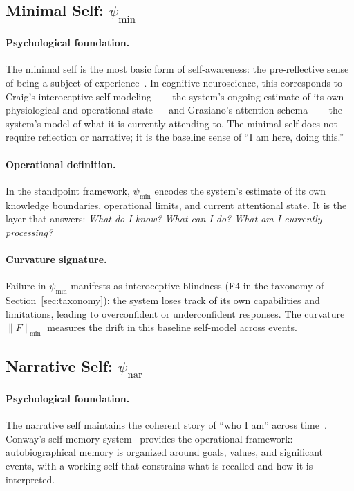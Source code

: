 \subsection{Minimal Self: $\psi_{\min}$}
\label{sec:psi-min}

\paragraph{Psychological foundation.}
The minimal self is the most basic form of self-awareness: the pre-reflective sense of
being a subject of experience~\cite{zahavi2005subjectivity}. In cognitive neuroscience,
this corresponds to Craig's interoceptive self-modeling~\cite{craig2002feelings} --- the
system's ongoing estimate of its own physiological and operational state --- and
Graziano's attention schema~\cite{graziano2017attention} --- the system's model of what
it is currently attending to. The minimal self does not require reflection or narrative;
it is the baseline sense of ``I am here, doing this.''

\paragraph{Operational definition.}
In the standpoint framework, $\psi_{\min}$ encodes the system's estimate of its own
knowledge boundaries, operational limits, and current attentional state. It is the layer
that answers: \emph{What do I know? What can I do? What am I currently processing?}

\paragraph{Curvature signature.}
Failure in $\psi_{\min}$ manifests as interoceptive blindness (F4 in the taxonomy of
Section~\ref{sec:taxonomy}): the system loses track of its own capabilities and
limitations, leading to overconfident or underconfident responses. The curvature
$\|F\|_{\min}$ measures the drift in this baseline self-model across events.

\subsection{Narrative Self: $\psi_{\mathrm{nar}}$}
\label{sec:psi-nar}

\paragraph{Psychological foundation.}
The narrative self maintains the coherent story of ``who I am'' across
time~\cite{dennett1991consciousness}. Conway's self-memory
system~\cite{conway2000self} provides the operational framework: autobiographical memory
is organized around goals, values, and significant events, with a working self that
constrains what is recalled and how it is interpreted.

